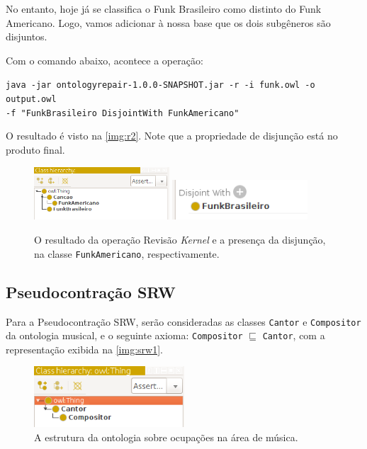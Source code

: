 No entanto, hoje já se classifica o Funk Brasileiro como distinto do Funk Americano. Logo, vamos adicionar à nossa base que os dois subgêneros são disjuntos.

Com o comando abaixo, acontece a operação:

\begin{small}
	\texttt{java -jar ontologyrepair-1.0.0-SNAPSHOT.jar -r -i funk.owl -o output.owl \\ -f "FunkBrasileiro DisjointWith FunkAmericano"}
\end{small}

O resultado é visto na \autoref{img:r2}. Note que a propriedade de disjunção está no produto final.

\begin{figure}[H]
	\centering
	\includegraphics[width=0.45\textwidth]{Capitulos/Implementacao/r2.png}
	\includegraphics[width=0.45\textwidth]{Capitulos/Implementacao/r3.png}
	\caption{O resultado da operação Revisão \textit{Kernel} e a presença da disjunção, na classe \texttt{FunkAmericano}, respectivamente.}
	\label{img:r2}
\end{figure}

\subsection{Pseudocontração SRW}
\label{sect:srw}

Para a Pseudocontração SRW, serão consideradas as classes \texttt{Cantor} e \texttt{Compositor} da ontologia musical, e o seguinte axioma: \texttt{Compositor} $ \sqsubseteq $ \texttt{Cantor}, com a representação exibida na \autoref{img:srw1}.

\begin{figure}[H]
	\centering
	\includegraphics[width=0.5\textwidth]{Capitulos/Implementacao/srw1.png}
	\caption{A estrutura da ontologia sobre ocupações na área de música.}
	\label{img:srw1}
\end{figure}

